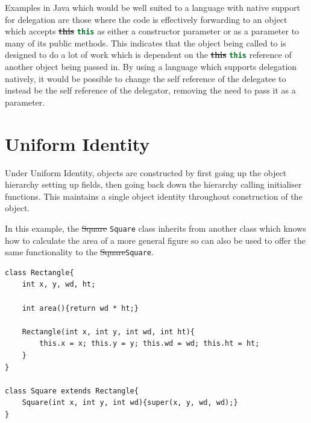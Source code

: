 \documentclass[11pt
              , a4paper
              , twoside
              , openright
              ]{report}
\newcommand{\java}[1]{\lstinline[language=Java]{#1}} %
\providecommand{\DIFdel}[1]{{\protect\color{red}\sout{#1}}}                      %
\providecommand{\DIFaddbegin}{} %
\providecommand{\DIFaddend}{} %
\providecommand{\DIFdelbegin}{} %
\providecommand{\DIFdelend}{} %
\begin{document}
Examples in Java which would be well suited to a language with native support for delegation are those where the code is effectively forwarding to an object which accepts \DIFdelbegin \textbf{\DIFdel{this}} %
\DIFdelend \DIFaddbegin \java{this} \DIFaddend as either a constructor parameter or as a parameter to many of its public methods. This indicates that the object being called to is designed to do a lot of work which is dependent on the \DIFdelbegin \textbf{\DIFdel{this}} %
\DIFdelend \DIFaddbegin \java{this} \DIFaddend reference of another object being passed in. By using a language which supports delegation natively, it would be possible to change the self reference of the delegatee to instead be the self reference of the delegator, removing the need to pass it as a parameter.

\section{Uniform Identity}
Under Uniform Identity, objects are constructed by first going up the object hierarchy setting up fields, then going back down the hierarchy calling initialiser functions. This maintains a single object identity throughout construction of the object.
\newline

In this example, the \DIFdelbegin \DIFdel{Square }\DIFdelend \DIFaddbegin \java{Square} \DIFaddend class inherits from another class which knows how to calculate the area of a more general figure so can also be used to offer the same functionality to the \DIFdelbegin \DIFdel{Square}\DIFdelend \DIFaddbegin \java{Square}\DIFaddend . 
\begin{lstlisting}
class Rectangle{
	int x, y, wd, ht;

	int area(){return wd * ht;}

	Rectangle(int x, int y, int wd, int ht){
		this.x = x; this.y = y; this.wd = wd; this.ht = ht;
	}
}

class Square extends Rectangle{
	Square(int x, int y, int wd){super(x, y, wd, wd);}
}
\end{lstlisting}
\end{document}
